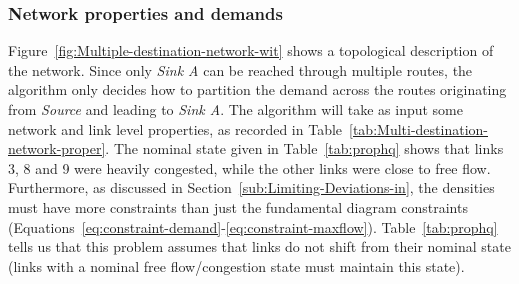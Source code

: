 \subsubsection{Network properties and demands\label{sub:Network-properties-and}}

Figure~\ref{fig:Multiple-destination-network-wit} shows a topological
description of the network. Since only \emph{Sink A }can be reached
through multiple routes, the algorithm only decides how to partition
the demand across the routes originating from \emph{Source} and leading
to \emph{Sink A}. The algorithm will take as input some network and
link level properties, as recorded in Table~\ref{tab:Multi-destination-network-proper}.
The nominal state given in Table~\ref{tab:prophq} shows that links
3, 8 and 9 were heavily congested, while the other links were close
to free flow. Furthermore, as discussed in Section~\ref{sub:Limiting-Deviations-in},
the densities must have more constraints than just the fundamental
diagram constraints (Equations~\eqref{eq:constraint-demand}-\eqref{eq:constraint-maxflow}).
Table~\ref{tab:prophq} tells us that this problem assumes that links
do not shift from their nominal state (links with a nominal free flow/congestion
state must maintain this state).

